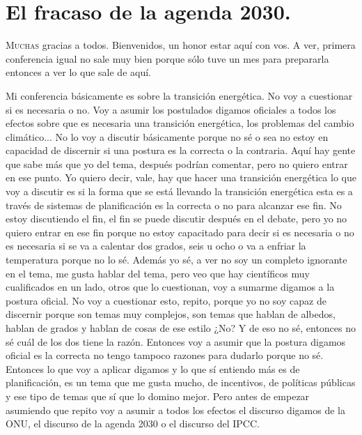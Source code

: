 \chapter{El fracaso de la agenda 2030.}


\lettrine[lines=2, findent=3pt, nindent=0pt]{M}{uchas} gracias a todos. Bienvenidos, un honor estar aquí con vos. A ver, primera conferencia igual no sale muy bien porque sólo tuve un mes para prepararla entonces a ver lo que sale de aquí.

Mi conferencia básicamente es sobre la transición energética. No voy a cuestionar si es necesaria o no. Voy a asumir los postulados digamos oficiales a todos los efectos sobre que es necesaria una transición energética, los problemas del cambio climático... No lo voy a discutir básicamente porque no sé o sea no estoy en capacidad de discernir si una postura es la correcta o la contraria. Aquí hay gente que sabe más que yo del tema, después podrían comentar, pero no quiero entrar en ese punto. Yo quiero decir, vale, hay que hacer una transición energética lo que voy a discutir es si la forma que se está llevando la transición energética esta es a través de sistemas de planificación es la correcta o no para alcanzar ese fin. No estoy discutiendo el fin, el fin se puede discutir después en el debate, pero yo no quiero entrar en ese fin porque no estoy capacitado para decir si es necesaria o no es necesaria si se va a calentar dos grados, seis u ocho o va a enfriar la temperatura porque no lo sé. Además yo sé, a ver no soy un completo ignorante en el tema, me gusta hablar del tema, pero veo que hay científicos muy cualificados en un lado, otros que lo cuestionan, voy a sumarme digamos a la postura oficial. No voy a cuestionar esto, repito, porque yo no soy capaz de discernir porque son temas muy complejos, son temas que hablan de albedos, hablan de grados y hablan de cosas de ese estilo ¿No? Y de eso no sé, entonces no sé cuál de los dos tiene la razón. Entonces voy a asumir que la postura digamos oficial es la correcta no tengo tampoco razones para dudarlo porque no sé. Entonces lo que voy a aplicar digamos y lo que sí entiendo más es de planificación, es un tema que me gusta mucho, de incentivos, de políticas públicas y ese tipo de temas que sí que lo domino mejor. Pero antes de empezar asumiendo que repito voy a asumir a todos los efectos el discurso digamos de la ONU, el discurso de la agenda 2030 o el discurso del IPCC.

